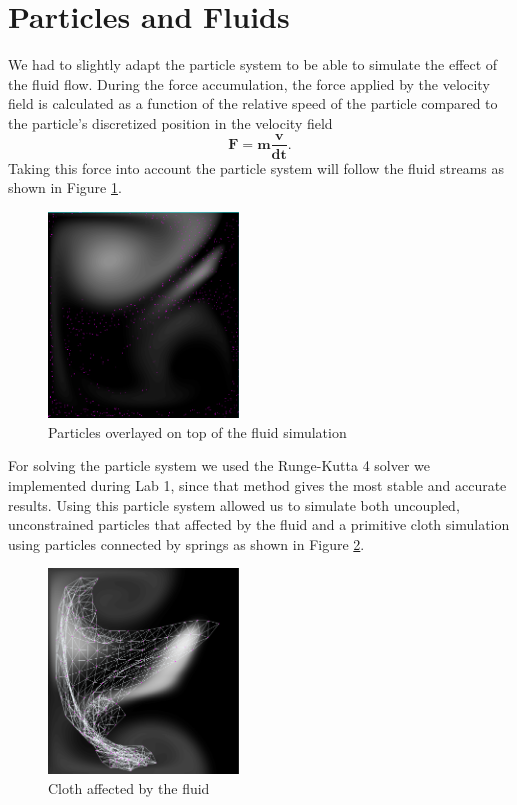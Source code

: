 \documentclass[a4paper,twoside,11pt,twocolumn]{article}
\begin{document}
\section{Particles and Fluids}
We had to slightly adapt the particle system to be able to simulate the effect of the fluid flow. During the force accumulation, the force applied by the velocity field is calculated as a function of the relative speed of the particle compared to the particle's discretized position in the velocity field \[ \mathbf{F} = \mathbf{m\frac{v}{dt}}. \] Taking this force into account the particle system will follow the fluid streams as shown in Figure \ref{fig:particles}.

\begin{figure}[H]
	\centering
	\includegraphics[width=0.45\textwidth]{particles}
	\caption{Particles overlayed on top of the fluid simulation}
	\label{fig:particles}
\end{figure}

For solving the particle system we used the Runge-Kutta 4 solver we implemented during Lab 1, since that method gives the most stable and accurate results. Using this particle system allowed us to simulate both uncoupled, unconstrained particles that affected by the fluid and a primitive cloth simulation using particles connected by springs as shown in Figure \ref{fig:cloth}.

\begin{figure}[H]
	\centering
	\includegraphics[width=0.45\textwidth]{cloth}
	\caption{Cloth affected by the fluid}
	\label{fig:cloth}
\end{figure}
\end{document}

